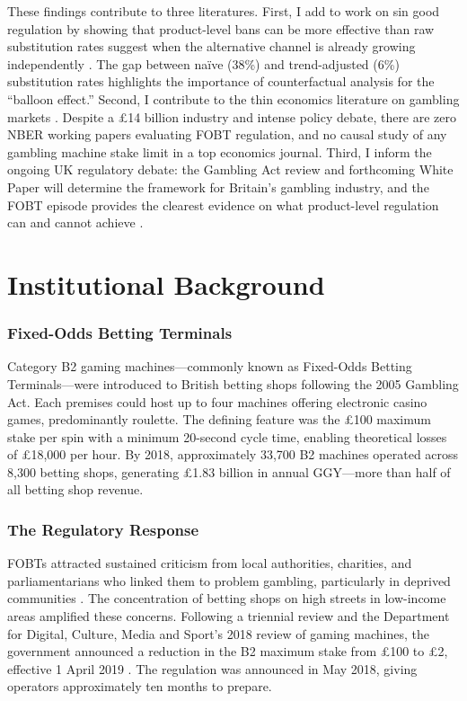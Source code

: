\documentclass[12pt]{article}
\begin{document}
These findings contribute to three literatures. First, I add to work on sin good regulation by showing that product-level bans can be more effective than raw substitution rates suggest when the alternative channel is already growing independently \citep{gruber2001tobacco, gruber2005tax, allcott2019regressive}. The gap between na\"ive (38\%) and trend-adjusted (6\%) substitution rates highlights the importance of counterfactual analysis for the ``balloon effect.'' Second, I contribute to the thin economics literature on gambling markets \citep{kearney2005state, grinols2004casinos, conlisk1993utility}. Despite a \pounds 14 billion industry and intense policy debate, there are zero NBER working papers evaluating FOBT regulation, and no causal study of any gambling machine stake limit in a top economics journal. Third, I inform the ongoing UK regulatory debate: the Gambling Act review and forthcoming White Paper will determine the framework for Britain's gambling industry, and the FOBT episode provides the clearest evidence on what product-level regulation can and cannot achieve \citep{dcms2018review, wardle2019gambling, snowdon2018gambling}.

\section{Institutional Background}

\subsubsection*{Fixed-Odds Betting Terminals} Category B2 gaming machines---commonly known as Fixed-Odds Betting Terminals---were introduced to British betting shops following the 2005 Gambling Act. Each premises could host up to four machines offering electronic casino games, predominantly roulette. The defining feature was the \pounds 100 maximum stake per spin with a minimum 20-second cycle time, enabling theoretical losses of \pounds 18,000 per hour. By 2018, approximately 33,700 B2 machines operated across 8,300 betting shops, generating \pounds 1.83 billion in annual GGY---more than half of all betting shop revenue.

\subsubsection*{The Regulatory Response} FOBTs attracted sustained criticism from local authorities, charities, and parliamentarians who linked them to problem gambling, particularly in deprived communities \citep{wardle2019gambling}. The concentration of betting shops on high streets in low-income areas amplified these concerns. Following a triennial review and the Department for Digital, Culture, Media and Sport's 2018 review of gaming machines, the government announced a reduction in the B2 maximum stake from \pounds 100 to \pounds 2, effective 1 April 2019 \citep{dcms2018review}. The regulation was announced in May 2018, giving operators approximately ten months to prepare.
\end{document}
